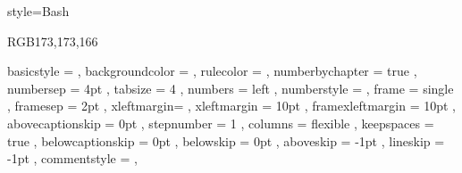 {
    style=Bash
}

\definecolor{sublimegray} {RGB}{173,173,166}

{
    basicstyle       = 
    \ttfamily\color{sublimewhite}
    \lst@ifdisplaystyle\scriptsize\fi %
,   backgroundcolor  = \color{sublimeblack}
,   rulecolor        = \color{black}
,   numberbychapter  = true
,   numbersep        = 4pt
,   tabsize          =  4          
,   numbers          = left
,   numberstyle      = \renewcommand{\thelstnumber}{>}\tiny\color{sublimewhite}\noncopynumber
,   frame            = single
,   framesep         =  2pt
,   xleftmargin=\parindent
,   xleftmargin      = 10pt
,   framexleftmargin = 10pt
,   abovecaptionskip = 0pt
,   stepnumber       = 1
,   columns          = flexible
,   keepspaces       = true
,   belowcaptionskip = 0pt
,   belowskip        = 0pt
,   aboveskip        = -1pt
,   lineskip         = -1pt
,   commentstyle     = \color{sublimegray},
}
